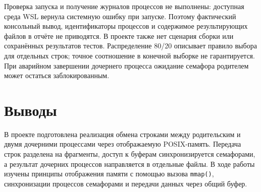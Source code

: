 \documentclass[12pt,a4paper]{article}
\begin{document}
Проверка запуска и получение журналов процессов не выполнены: доступная среда WSL вернула системную ошибку при запуске. Поэтому фактический консольный вывод, идентификаторы процессов и содержимое результирующих файлов в отчёте не приводятся. В проекте также нет сценария сборки или сохранённых результатов тестов. Распределение 80/20 описывает правило выбора для отдельных строк; точное соотношение в конечной выборке не гарантируется. При аварийном завершении дочернего процесса ожидание семафора родителем может остаться заблокированным.
\section{Выводы}
В проекте подготовлена реализация обмена строками между родительским и двумя дочерними процессами через отображаемую POSIX-память. Передача строк разделена на фрагменты, доступ к буферам синхронизируется семафорами, а результат дочерних процессов направляется в отдельные файлы. В ходе работы изучены принципы отображения памяти с помощью вызова \texttt{mmap()}, синхронизации процессов семафорами и передачи данных через общий буфер.
\end{document}
